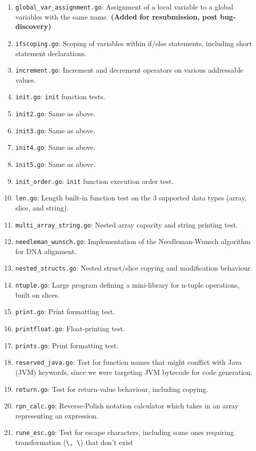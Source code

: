 \documentclass[11pt]{article}
\begin{document}
\begin{enumerate}
\item \texttt{global\_var\_assignment.go}: Assignment of a local variable to a global variables with the same name. \textbf{(Added for resubmission, post bug-discovery)}
\item \texttt{ifscoping.go}: Scoping of variables within if/else statements, including short statement declarations.
\item \texttt{increment.go}: Increment and decrement operators on various addressable values.
\item \texttt{init.go}: \texttt{init} function tests.
\item \texttt{init2.go}: Same as above.
\item \texttt{init3.go}: Same as above.
\item \texttt{init4.go}: Same as above.
\item \texttt{init5.go}: Same as above.
\item \texttt{init\_order.go}: \texttt{init} function execution order test.
\item \texttt{len.go}: Length built-in function test on the 3 supported data types (array, slice, and string).
\item \texttt{multi\_array\_string.go}: Nested array capacity and string printing test.
\item \texttt{needleman\_wunsch.go}: Implementation of the Needleman-Wunsch algorithm for DNA alignment.
\item \texttt{nested\_structs.go}: Nested struct/slice copying and modification behaviour.
\item \texttt{ntuple.go}: Large program defining a mini-library for n-tuple operations, built on slices.
\item \texttt{print.go}: Print formatting test.
\item \texttt{printfloat.go}: Float-printing test.
\item \texttt{prints.go}: Print formatting test.
\item \texttt{reserved\_java.go}: Test for function names that might conflict with Java (JVM) keywords, since we were targeting JVM bytecode for code generation.
\item \texttt{return.go}: Test for return-value behaviour, including copying.
\item \texttt{rpn\_calc.go}: Reverse-Polish notation calculator which takes in an array representing an expression.
\item \texttt{rune\_esc.go}: Test for escape characters, including some ones requiring transformation (\texttt{\textbackslash\@a, \textbackslash\@v}) that don't exist

\end{enumerate}
\end{document}
